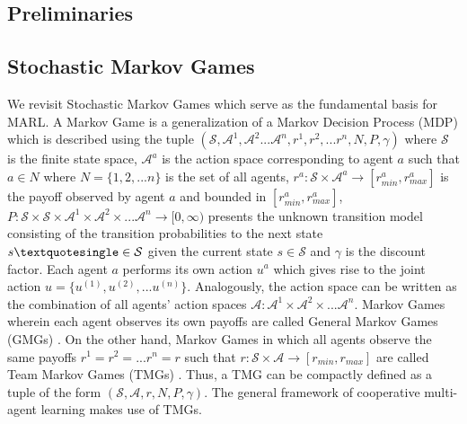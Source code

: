 \documentclass{article}
\begin{document}
\begin{multicols}{2}
\section{Preliminaries}

\subsection{Stochastic Markov Games}
We revisit Stochastic Markov Games \cite{overview} which serve as the fundamental basis for MARL. A Markov Game \cite{gt} is a generalization of a Markov Decision Process (MDP) \cite{rl} which is described using the tuple $(\mathcal{S},\mathcal{A}^{1},\mathcal{A}^{2}...\mathcal{A}^{n},r^{1},r^{2},...r^{n},N,P,\gamma)$ where $\mathcal{S}$ is the finite state space, $\mathcal{A}^{a}$ is the action space corresponding to agent $a$ such that $a \in N$ where $N = \{1,2,...n\}$ is the set of all agents, $r^{a}: \mathcal{S} \times \mathcal{A}^{a} \rightarrow [r_{min}^{a},r_{max}^{a}]$ is the payoff observed by agent $a$ and bounded in $[r_{min}^{a},r_{max}^{a}]$, $P: \mathcal{S} \times \mathcal{S} \times \mathcal{A}^{1} \times \mathcal{A}^{2} \times ...\mathcal{A}^{n} \rightarrow [0,\infty)$ presents the unknown transition model consisting of the transition probabilities to the next state $s\textquotesingle \in \mathcal{S}$ given the current state $s \in \mathcal{S}$ and $\gamma$ is the discount factor. Each agent $a$ performs its own action $u^{a}$ which gives rise to the joint action $u = \{u^{(1)},u^{(2)},...u^{(n)}\}$. Analogously, the action space can be written as the combination of all agents' action spaces $\mathcal{A}:\mathcal{A}^{1} \times \mathcal{A}^{2} \times ... \mathcal{A}^{n}$. Markov Games wherein each agent observes its own payoffs are called General Markov Games (GMGs) \cite{overview}. On the other hand, Markov Games in which all agents observe the same payoffs $r^{1} = r^{2} = ...r^{n} = r$ such that $r: \mathcal{S} \times \mathcal{A} \rightarrow [r_{min},r_{max}]$ are called Team Markov Games (TMGs) \cite{gt}. Thus, a TMG can be compactly defined as a tuple of the form $(\mathcal{S},\mathcal{A},r,N,P,\gamma)$. The general framework of cooperative multi-agent learning makes use of TMGs. 


\end{multicols}
\end{document}
